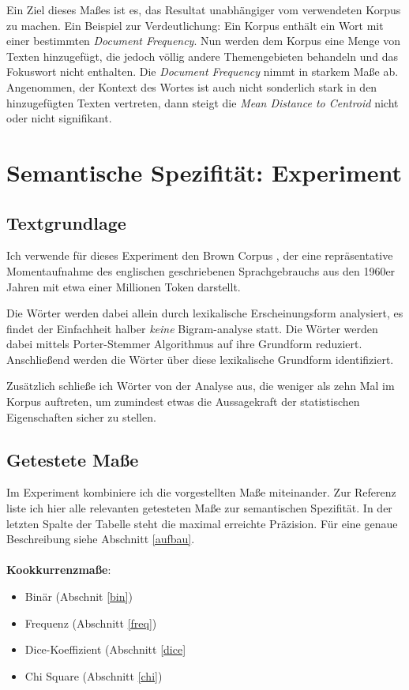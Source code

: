 \documentclass[11pt,numbers=noenddot]{scrartcl}
\begin{document}
Ein Ziel dieses Maßes ist es, das Resultat unabhängiger vom verwendeten Korpus zu machen. Ein Beispiel zur Verdeutlichung: Ein Korpus enthält ein Wort mit einer bestimmten \emph{Document Frequency}. Nun werden dem Korpus eine Menge von Texten hinzugefügt, die jedoch völlig andere Themengebieten behandeln und das Fokuswort nicht enthalten. Die \emph{Document Frequency} nimmt in starkem Maße ab. Angenommen, der Kontext des Wortes ist auch nicht sonderlich stark in den hinzugefügten Texten vertreten, dann steigt die \emph{Mean Distance to Centroid} nicht oder nicht signifikant.

\section{Semantische Spezifität: Experiment}

\subsection{Textgrundlage}

Ich verwende für dieses Experiment den Brown Corpus \citep{francis1979brown}, der eine repräsentative Momentaufnahme des englischen geschriebenen Sprachgebrauchs aus den 1960er Jahren mit etwa einer Millionen Token darstellt.

Die Wörter werden dabei allein durch lexikalische Erscheinungsform analysiert, es findet der Einfachheit halber \emph{keine} Bigram-analyse statt. Die Wörter werden dabei mittels Porter-Stemmer Algorithmus \citep{Porter:1997:ASS:275537.275705} auf ihre Grundform reduziert. Anschließend werden die Wörter über diese lexikalische Grundform identifiziert.

Zusätzlich schließe ich Wörter von der Analyse aus, die weniger als zehn Mal im Korpus auftreten, um zumindest etwas die Aussagekraft der statistischen Eigenschaften sicher zu stellen.

\subsection{Getestete Maße}

Im Experiment kombiniere ich die vorgestellten Maße miteinander. Zur Referenz liste ich hier alle relevanten getesteten Maße zur semantischen Spezifität. In der letzten Spalte der Tabelle steht die maximal erreichte Präzision. Für eine genaue Beschreibung siehe Abschnitt \ref{aufbau}.
\\\\
\textbf{Kookkurrenzmaße}:
\begin{itemize}
    \item Binär (Abschnit \ref{bin})
    \item Frequenz (Abschnitt \ref{freq})
    \item Dice-Koeffizient (Abschnitt \ref{dice}
    \item Chi Square (Abschnitt \ref{chi})
\end{itemize}
\end{document}
